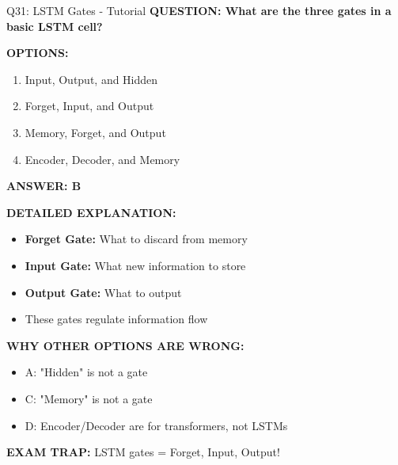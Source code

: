 \documentclass[8pt]{beamer}
\begin{document}
	\begin{frame}{Q31: LSTM Gates - Tutorial}
		\fontsize{6.5}{7.5}\selectfont
		\textbf{QUESTION: What are the three gates in a basic LSTM cell?}
		
		\vspace{0.1cm}
		\textbf{OPTIONS:}
		\begin{enumerate}
			\item Input, Output, and Hidden
			\item Forget, Input, and Output
			\item Memory, Forget, and Output
			\item Encoder, Decoder, and Memory
		\end{enumerate}
		
		\vspace{0.1cm}
		\textcolor{myblue}{\textbf{ANSWER: B}}
		
		\vspace{0.1cm}
		\textbf{DETAILED EXPLANATION:}
		\begin{itemize}
			\item \textbf{Forget Gate:} What to discard from memory
			\item \textbf{Input Gate:} What new information to store
			\item \textbf{Output Gate:} What to output
			\item These gates regulate information flow
		\end{itemize}
		
		\vspace{0.1cm}
		\textcolor{myred}{\textbf{WHY OTHER OPTIONS ARE WRONG:}}
		\begin{itemize}
			\item \textcolor{myred}{A:} "Hidden" is not a gate
			\item \textcolor{myred}{C:} "Memory" is not a gate
			\item \textcolor{myred}{D:} Encoder/Decoder are for transformers, not LSTMs
		\end{itemize}
		
		\textcolor{myred}{\textbf{EXAM TRAP:}} LSTM gates = \textcolor{myblue}{Forget, Input, Output}!
	\end{frame}
	
\end{document}
